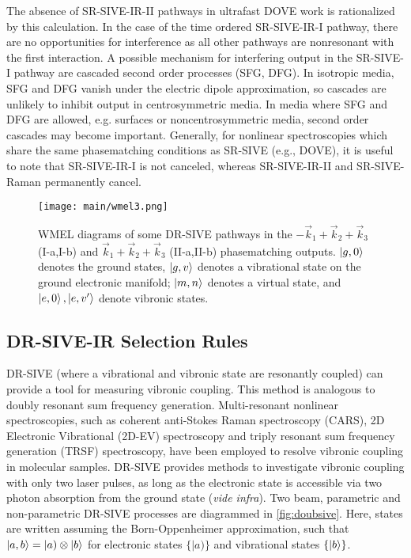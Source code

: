 \documentclass[aip, jcp, reprint, twocolumn]{revtex4-2}
\begin{document}
The absence of SR-SIVE-IR-II pathways in ultrafast DOVE work is rationalized by this calculation. \cite{RN367, McDonnell2024}
In the case of the time ordered SR-SIVE-IR-I pathway, there are no opportunities for interference as all other pathways are nonresonant with the first interaction. 
A possible mechanism for interfering output in the SR-SIVE-I pathway are cascaded second order processes (SFG, DFG). \cite{RN243, RN300}
In isotropic media, SFG and DFG vanish under the electric dipole approximation,\cite{Zhu87} so cascades are unlikely to inhibit output in centrosymmetric media.
In media where SFG and DFG are allowed, e.g. surfaces or noncentrosymmetric media, second order cascades may become important. 
Generally, for nonlinear spectroscopies which share the same phasematching conditions as SR-SIVE (e.g., DOVE), it is useful to note that SR-SIVE-IR-I is not canceled, whereas SR-SIVE-IR-II and SR-SIVE-Raman permanently cancel.

\begin{figure}[!htbp]
	\centering
	\texttt{[image: main/wmel3.png]}
	\caption{WMEL diagrams of some DR-SIVE pathways in the $-\vec{k}_1 + \vec{k}_2+ \vec{k}_3$  (I-a,I-b) and $\vec{k}_1 + \vec{k}_2+ \vec{k}_3$ (II-a,II-b) phasematching outputs. $\ket{g,0}$ denotes the ground states, $\ket{g,v}$ denotes a vibrational state on the ground electronic manifold; $\ket{m,n}$ denotes a virtual state, and $\ket{e,0}, \ket{e,v'}$ denote vibronic states.}
	\label{fig:doubsive}
\end{figure}

\subsection{DR-SIVE-IR Selection Rules} %
DR-SIVE (where a vibrational and vibronic state are resonantly coupled) can provide a tool for measuring vibronic coupling.
This method is analogous to doubly resonant sum frequency generation. \cite{Shen94}
Multi-resonant nonlinear spectroscopies, such as coherent anti-Stokes Raman spectroscopy (CARS), 2D Electronic Vibrational (2D-EV) spectroscopy and triply resonant sum frequency generation (TRSF) spectroscopy, have been employed to resolve vibronic coupling in molecular samples. \cite{Carlson1990, Gaynor2017, RN276}
DR-SIVE provides methods to investigate vibronic coupling with only two laser pulses, as long as the electronic state is accessible via two photon absorption from the ground state (\textit{vide infra}).
Two beam, parametric and non-parametric DR-SIVE processes are diagrammed in \autoref{fig:doubsive}.
Here, states are written assuming the Born-Oppenheimer approximation, such that $\ket{a,b} = |a) \otimes \ket{b}$ for electronic states $\{|a)\}$ and vibrational states $\{\ket{b}\}$. \cite{BornOppenheimer, Albrecht1960}
\end{document}
